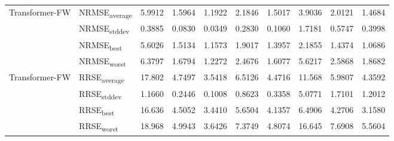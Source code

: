 {\begin{longtable}{l l c c c c c c c c}
\cmidrule(lr){2-10}
\multirow{4}{*}{Transformer-FW} & NRMSE\textsubscript{average} & 5.9912 & 1.5964 & 1.1922 & 2.1846 & 1.5017 & 3.9036 & 2.0121 & 1.4684 \\
 & NRMSE\textsubscript{stddev} & 0.3885 & 0.0830 & 0.0349 & 0.2830 & 0.1060 & 1.7181 & 0.5747 & 0.3998 \\
 & NRMSE\textsubscript{best} & 5.6026 & 1.5134 & 1.1573 & 1.9017 & 1.3957 & 2.1855 & 1.4374 & 1.0686 \\
 & NRMSE\textsubscript{worst} & 6.3797 & 1.6794 & 1.2272 & 2.4676 & 1.6077 & 5.6217 & 2.5868 & 1.8682 \\
\cmidrule(lr){2-10}
\multirow{4}{*}{Transformer-FW} & RRSE\textsubscript{average} & 17.802 & 4.7497 & 3.5418 & 6.5126 & 4.4716 & 11.568 & 5.9807 & 4.3592 \\
 & RRSE\textsubscript{stddev} & 1.1660 & 0.2446 & 0.1008 & 0.8623 & 0.3358 & 5.0771 & 1.7101 & 1.2012 \\
 & RRSE\textsubscript{best} & 16.636 & 4.5052 & 3.4410 & 5.6504 & 4.1357 & 6.4906 & 4.2706 & 3.1580 \\
 & RRSE\textsubscript{worst} & 18.968 & 4.9943 & 3.6426 & 7.3749 & 4.8074 & 16.645 & 7.6908 & 5.5604 \\
\cmidrule(lr){2-10}
\end{longtable}
}